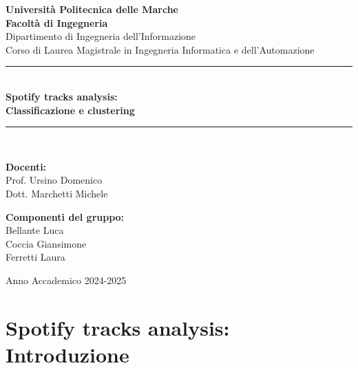 \documentclass[12pt,a4paper]{article}
\begin{document}
\begin{titlepage}
    \centering
    \vspace*{0.5cm}
    {\Large \textbf{Università Politecnica delle Marche}}\\[0.3cm]
    {\large \textbf{Facoltà di Ingegneria}}\\[0.2cm]
    {\large Dipartimento di Ingegneria dell'Informazione}\\[0.2cm]
    {\small Corso di Laurea Magistrale in Ingegneria Informatica e dell'Automazione}\\[2.0cm]
    
    \rule{\linewidth}{0.8pt}\\[0.5cm]
    {\LARGE \textbf{Spotify tracks analysis:\\ Classificazione e clustering}}\\[0.3cm]
    \rule{\linewidth}{0.8pt}\\[3.0cm]
    
    \begin{minipage}{0.48\textwidth}
        \textbf{Docenti:}\\[0.2cm]
        Prof. Ursino Domenico\\
        Dott. Marchetti Michele
    \end{minipage}
    \hfill
    \begin{minipage}{0.48\textwidth}
        \begin{flushright}
            \textbf{Componenti del gruppo:}\\[0.2cm]
            Bellante Luca\\
            Coccia Giansimone\\
            Ferretti Laura
        \end{flushright}
    \end{minipage}
    
    \vfill
    {\large Anno Accademico 2024-2025}
    \vspace*{0.5cm}
\end{titlepage}

\newpage
\tableofcontents
\newpage

\section{Spotify tracks analysis: Introduzione}
\end{document}
